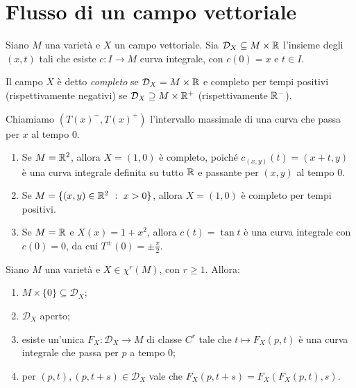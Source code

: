 \section{Flusso di un campo vettoriale} %

\begin{definition}  
	Siano $M$ una varietà e $X$ un campo vettoriale. Sia $\mathcal D_X\subseteq M\times \mathbb R$ l'insieme degli $(x,t)$ tali che esiste $c:I\to M$ curva integrale, con $c(0)=x$ e $t \in I$.
	
	Il campo $X$ è detto \emph{completo} se $\mathcal D_X=M\times \mathbb R$ e completo per tempi positivi (rispettivamente negativi) se $\mathcal D_X\supseteq M\times\mathbb R^+$ (rispettivamente $\mathbb R^-$).
	
	Chiamiamo $(T(x)^-,T(x)^+)$ l'intervallo massimale di una curva che passa per $x$ al tempo 0. 
\end{definition}

\begin{example}
\begin{enumerate}
	\item Se $M=\mathbb R^2$, allora $X=(1,0)$ è completo, poiché $c_{(x,y)}(t)=(x+t,y)$ è una curva integrale definita su tutto $\mathbb R$ e passante per $(x,y)$ al tempo 0.
	\item Se $M=\{(x,y) \in \mathbb R^2 \ :\  x>0\}$, allora $X=(1,0)$ è completo per tempi positivi.
	\item Se $M=\mathbb R$ e $X(x)=1+x^2$, allora $c(t)=\tan t$ è una curva integrale con $c(0)=0$, da cui $T^\pm(0)=\pm \frac \pi 2$.
\end{enumerate}
\end{example}

\begin{proposition} \label{prop:ProprietaDX}
	Siano $M$ una varietà e $X\in \chi^r(M)$, con $r\ge 1$. Allora:
	\begin{enumerate}
	 \item $M\times\{0\}\subseteq \mathcal D_X$; \label{PDX:ContieneM}
	 \item $\mathcal D_X$ aperto; \label{PDX:Aperto}
	 \item esiste un'unica $F_X:\mathcal D_X\to M$ di classe $C^r$ tale che $t\mapsto F_X(p,t)$ è una curva integrale che passa per $p$ a tempo 0; \label{PDX:FunzioneSuDX}
	 \item per $(p,t),(p,t+s)\in\mathcal D_X$ vale che $F_X(p,t+s)=F_X(F_X(p,t),s)$. \label{PDX:Composizione}
	\end{enumerate}
\end{proposition}

